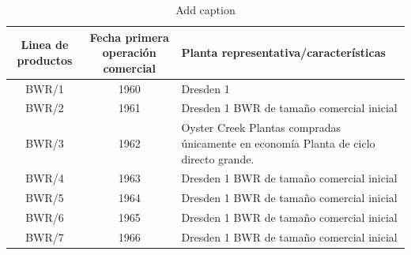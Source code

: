 \documentclass[letterpaper,10pt,table, dvipsnames]{article}
\begin{document}
\begin{table}[htbp]
  \centering
  \caption{Add caption}
    \begin{tabular}{|c|c|p{14.93em}|}
    \hline
    \multicolumn{1}{|p{5.355em}|}{Linea de productos } & \multicolumn{1}{p{9.93em}|}{Fecha\hspace{-1em} primera\hspace{3em} operación comercial} & Planta representativa/características \bigstrut\\
    \hline
    BWR/1 & 1960  & Dresden 1  \bigstrut\\
    \hline
    BWR/2 & 1961  & Dresden 1                                                        BWR de tamaño comercial inicial \bigstrut\\
    \hline
    BWR/3 & 1962  & Oyster Creek                                                                Plantas compradas únicamente en economía                                                                Planta de ciclo directo grande.  \bigstrut\\
    \hline
    BWR/4 & 1963  & Dresden 1 BWR de tamaño comercial inicial \bigstrut\\
    \hline
    BWR/5 & 1964  & Dresden 1 BWR de tamaño comercial inicial \bigstrut\\
    \hline
    BWR/6 & 1965  & Dresden 1 BWR de tamaño comercial inicial \bigstrut\\
    \hline
    BWR/7 & 1966  & Dresden 1 BWR de tamaño comercial inicial \bigstrut\\
    \hline
    \end{tabular}%
  \label{tab:addlabel}%
\end{table}%
\end{document}
